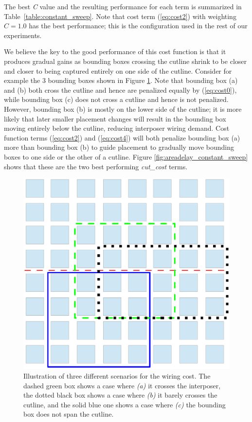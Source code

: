 \documentclass{sig-alternate-2013}
\begin{document}
The best \textit{C} value and the resulting performance for each term is summarized in Table~\ref{table:constant_sweep}. Note that cost term (\ref{eq:cost2}) with weighting $C = 1.0$ has the best performance; this is the configuration used in the rest of our experiments.

We believe the key to the good performance of this cost function is that it produces gradual gains as bounding boxes crossing the cutline shrink to be closer and closer to being captured entirely on one side of the cutline. Consider for example the 3 bounding boxes shown in Figure \ref{fig:bb_illustration}. Note that bounding box (a) and (b) both cross the cutline and hence are penalized equally by (\ref{eq:cost0}), while bounding box (c) does not cross a cutline and hence is not penalized. However, bounding box (b) is mostly on the lower side of the cutline; it is more likely that later smaller placement changes will result in the bounding box moving entirely below the cutline, reducing interposer wiring demand. Cost function terms (\ref{eq:cost2}) and (\ref{eq:cost4}) will both penalize bounding box (a) more than bounding box (b) to guide placement to gradually move bounding boxes to one side or the other of a cutline. Figure \ref{fig:areadelay_constant_sweep} shows that these are the two best performing \textit{cut\_cost} terms.

\begin{figure}[!htbp]
\centering
\includegraphics[width=\linewidth]{bb.eps}
\caption{Illustration of three different scenarios for the wiring cost. The dashed green box shows a case where \textit{(a)} it crosses the interposer, the dotted black box shows a case where \textit{(b)} it barely crosses the cutline, and the solid blue one shows a case where \textit{(c)} the bounding box does not span the cutline.}
\label{fig:bb_illustration}
\end{figure}
\end{document}
